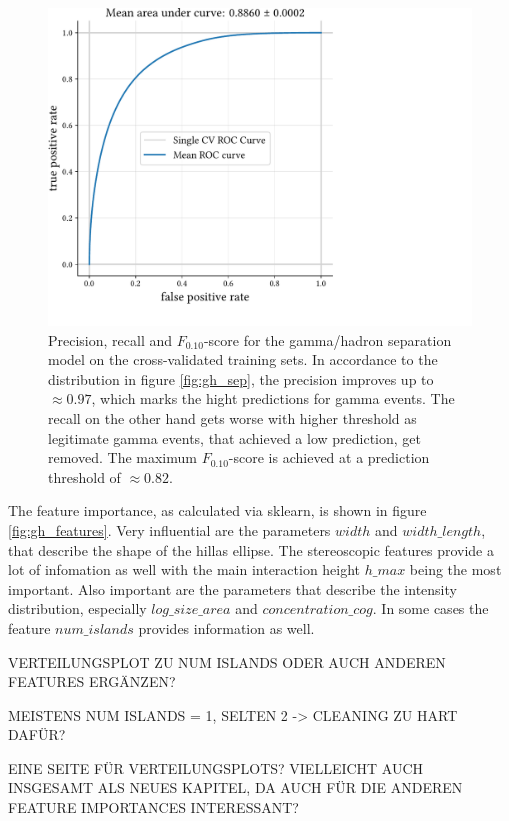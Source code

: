 \begin{figure}
    \centering
    \captionsetup{width=0.9\linewidth}
    \includegraphics[page=3, width=.9\textwidth]{../analysis/plots/cross_val_sep_perf_plot.pdf}
    \caption{Precision, recall and $F_{\num{0.10}}$-score for the gamma/hadron separation model on the 
    cross-validated training sets.
    In accordance to the distribution in figure \ref{fig:gh_sep}, the precision improves up
    to $\approx \num{0.97}$, which marks the hight predictions for gamma events.
    The recall on the other hand gets worse with higher threshold as legitimate gamma events,
    that achieved a low prediction, get removed. 
    The maximum $F_{\num{0.10}}$-score is achieved at a prediction threshold
    of $\approx \num{0.82}$.}
    \label{fig:gh_fscore}
\end{figure}


The feature importance, as calculated via sklearn, is shown in figure \ref{fig:gh_features}.
Very influential are the parameters $width$ and $width\_length$, that describe the shape of the hillas ellipse.
The stereoscopic features provide a lot of infomation as well with the main interaction height $h\_max$
being the most important.
Also important are the parameters that describe the intensity distribution, especially
$log\_size\_area$ and $concentration\_cog$.
In some cases the feature $num\_islands$ provides information as well.

VERTEILUNGSPLOT ZU NUM ISLANDS ODER AUCH ANDEREN FEATURES ERGÄNZEN?

MEISTENS NUM ISLANDS = 1, SELTEN 2 -> CLEANING ZU HART DAFÜR?

EINE SEITE FÜR VERTEILUNGSPLOTS? VIELLEICHT AUCH INSGESAMT ALS NEUES KAPITEL, DA AUCH FÜR DIE 
ANDEREN FEATURE IMPORTANCES INTERESSANT?

